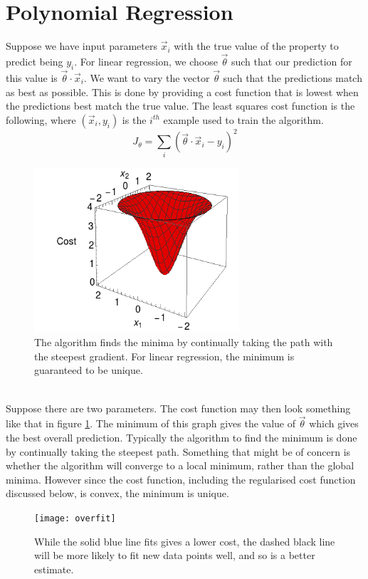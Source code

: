 \documentclass[a4paper,12pt]{report}
\begin{document}
\section{Polynomial Regression}
Suppose we have input parameters $\vec x_i$ with the true value of the property to predict being $y_i$. For linear regression, we choose $\vec\theta$ such that our prediction for this value is $\vec\theta \cdot \vec x_i$. We want to vary the vector $\vec \theta$ such that the predictions match as best as possible. This is done by providing a cost function that is lowest when the predictions best match the true value. The least squares cost function is the following, where $(\vec x_i,y_i)$ is the $i^{th}$ example used to train the algorithm.
$$J_\theta = \sum_i \left(\vec\theta\cdot \vec x_i -y_i\right)^2 $$
\begin{figure}[h]
\centering
\includegraphics[width=3in]{GradDescent}
\caption{The algorithm finds the minima by continually taking the path with the steepest gradient. For linear regression, the minimum is guaranteed to be unique.}
\label{graddesc}
\end{figure}
\\
Suppose there are two parameters. The cost function may then look something like that in figure \ref{graddesc}.  
The minimum of this graph gives the value of  $\vec\theta$ which gives the best overall prediction. 
Typically the algorithm to find the minimum is done by continually taking the steepest path. Something that might be of concern is whether the algorithm will converge to a local minimum, rather than the global minima. However since the cost function, including the regularised cost function discussed below, is convex, the minimum is unique.
\begin{figure}[h]
\centering
\texttt{[image: overfit]}
\caption{While the solid blue line fits gives a lower cost, the dashed black line will be more likely to fit new data points well, and so is a better estimate.}
\label{overfit}
\end{figure}
\end{document}
